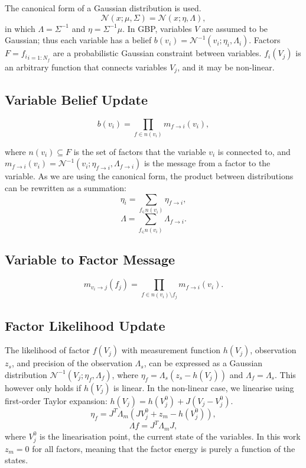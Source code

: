 \documentclass[twocolumn]{article}
\begin{document}
The canonical form of a Gaussian distribution is used.
\begin{equation}
\mathcal{N}(x; \mu,\Sigma) = \mathcal{N}(x; \eta,\Lambda),
\end{equation}
in which $\Lambda = \Sigma^{-1}$ and $\eta = \Sigma^{-1}\mu$. 
In GBP, variables $V$ are assumed to be Gaussian; thus each variable has a belief $b(v_i) = \mathcal{N}^{-1}(v_i;\eta_i,\Lambda_i)$. Factors $F = {f_i}_{i=1:N_f}$ are a probabilistic Gaussian constraint between variables. $f_i(V_j)$ is an arbitrary function that connects variables $V_j$, and it may be non-linear.  
\subsection{Variable Belief Update}
\begin{equation}
    b(v_i) = \prod_{f\in n(v_i)}{m_{f \rightarrow i}(v_i)},
\end{equation}

where $n(v_i) \subseteq F$ is the set of factors that the variable $v_i$ is connected to, and $m_{f \rightarrow i}(v_i) = \mathcal{N}^{-1}(v_i; \eta_{f \rightarrow i},\Lambda_{f \rightarrow i})$ is the message from a factor to the variable. As we are using the canonical form, the product between distributions can be rewritten as a summation:
\begin{equation}
    \eta_i = \sum_{f_\in n(v_i)}{\eta_{f \rightarrow i}},
\end{equation}
\begin{equation}
    \Lambda = \sum_{f_\in n(v_i)}{\Lambda_{f \rightarrow i}}.
\end{equation}

\subsection{Variable to Factor Message}
\begin{equation}
    m_{v_i \rightarrow j}(f_j) = \prod_{f \in n(v_i) \setminus f_j}{m_{f \rightarrow i}(v_i)}.
\end{equation}

\subsection{Factor Likelihood Update}
The likelihood of factor $f(V_j)$ with measurement function $h(V_j)$, observation $z_s$, and precision of the observation $\Lambda_s$, can be expressed as a Gaussian distribution $\mathcal{N}^{-1}(V_j; \eta_f, \Lambda_f)$, where $\eta_f = \Lambda_s(z_s - h(V_j))$ and $\Lambda_f = \Lambda_s$. This however only holds if $h(V_j)$ is linear. In the non-linear case, we linearise using first-order Taylor expansion: $h(V_j) = h(V^0_j) + J(V_j - V^0_j)$.
\begin{equation}
    \eta_{f} = J^T\Lambda_m(JV^0_j+z_m-h(V^0_j)),
\end{equation}
\begin{equation}
    \Lambda{f} = J^T\Lambda_mJ,
\end{equation}
where $V^0_j$ is the linearisation point, the current state of the variables. In this work $z_m = 0$ for all factors, meaning that the factor energy is purely a function of the states.
\end{document}
